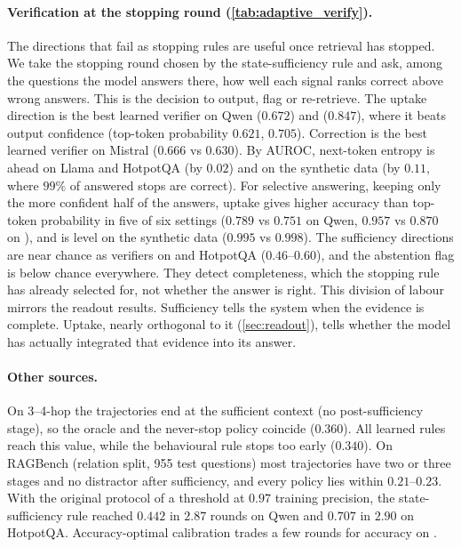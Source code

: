 \paragraph{Verification at the stopping round (\cref{tab:adaptive_verify}).} The directions that fail as stopping rules are useful once retrieval has stopped. We take the stopping round chosen by the state-sufficiency rule and ask, among the questions the model answers there, how well each signal ranks correct above wrong answers. This is the decision to output, flag or re-retrieve. The uptake direction is the best learned verifier on \musique{} Qwen ($0.672$) and \twowiki{} ($0.847$), where it beats output confidence (top-token probability $0.621$, $0.705$). Correction is the best learned verifier on Mistral ($0.666$ vs $0.630$). By AUROC, next-token entropy is ahead on Llama and HotpotQA (by $0.02$) and on the synthetic data (by $0.11$, where $99\%$ of answered stops are correct). For selective answering, keeping only the more confident half of the answers, uptake gives higher accuracy than top-token probability in five of six settings ($0.789$ vs $0.751$ on \musique{} Qwen, $0.957$ vs $0.870$ on \twowiki{}), and is level on the synthetic data ($0.995$ vs $0.998$). The sufficiency directions are near chance as verifiers on \musique{} and HotpotQA ($0.46$--$0.60$), and the abstention flag is below chance everywhere. They detect completeness, which the stopping rule has already selected for, not whether the answer is right. This division of labour mirrors the readout results. Sufficiency tells the system when the evidence is complete. Uptake, nearly orthogonal to it (\cref{sec:readout}), tells whether the model has actually integrated that evidence into its answer.

\begin{table}[t]
\centering\scriptsize
\setlength{\tabcolsep}{3pt}
\resizebox{\linewidth}{!}{}
\caption{Verification once retrieval stops (state-sufficiency stopping rule): AUROC of each signal at the stopping round for the correctness of the answer given there (answered stops only). Bold: best per column. Bottom: accuracy of all answered stops and of the half ranked highest by top-token probability or by the uptake direction.}
\label{tab:adaptive_verify}
\end{table}

\paragraph{Other sources.} On 3--4-hop \musique{} the trajectories end at the sufficient context (no post-sufficiency stage), so the oracle and the never-stop policy coincide ($0.360$). All learned rules reach this value, while the behavioural rule stops too early ($0.340$). On RAGBench (relation split, 955 test questions) most trajectories have two or three stages and no distractor after sufficiency, and every policy lies within $0.21$--$0.23$. With the original protocol of a threshold at $0.97$ training precision, the state-sufficiency rule reached $0.442$ in $2.87$ rounds on \musique{} Qwen and $0.707$ in $2.90$ on HotpotQA. Accuracy-optimal calibration trades a few rounds for accuracy on \musique{}.
